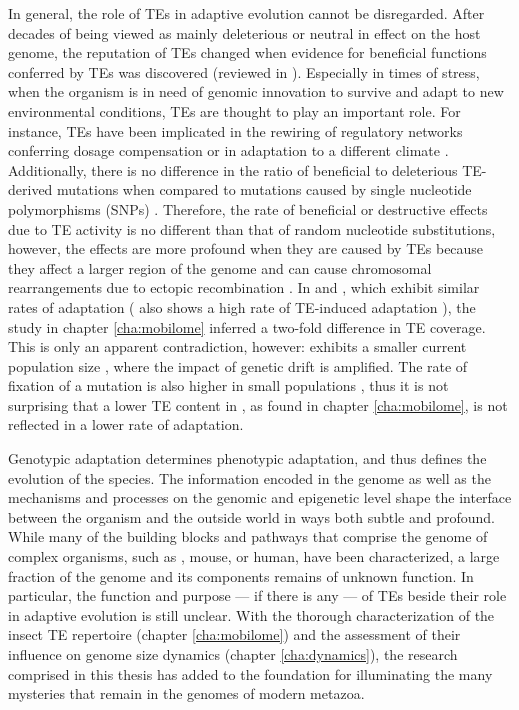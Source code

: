 In general, the role of TEs in adaptive evolution cannot be disregarded.
After decades of being viewed as mainly deleterious or neutral in effect
on the host genome, the reputation of TEs changed when evidence for
beneficial functions conferred by TEs was discovered (reviewed in
\citet{Oliver2012, Fedoroff2013}). Especially in times of stress, when
the organism is in need of genomic innovation to survive and adapt to
new environmental conditions, TEs are thought to play an important role.
For instance, TEs have been implicated in the rewiring of regulatory
networks conferring dosage compensation \citep{Ellison2013, Chuong2016}
or in adaptation to a different climate \citep{Gonzalez2010}.
Additionally, there is no difference in the ratio of beneficial to
deleterious TE-derived mutations when compared to mutations caused by
single nucleotide polymorphisms (SNPs) \citep{Akagi2013, Barron2014}.
Therefore, the rate of beneficial or destructive effects due to TE
activity is no different than that of random nucleotide substitutions,
however, the effects are more profound when they are caused by TEs
because they affect a larger region of the genome and can cause
chromosomal rearrangements due to ectopic recombination \citep{Gray2000,
Fiston-Lavier2007}. In  and , which exhibit similar rates of adaptation \citep{Bachtrog2008}
( also shows a high rate of TE-induced
adaptation \citep{Gonzalez2008}), the study in chapter
\ref{cha:mobilome} inferred a two-fold difference in TE coverage. This
is only an apparent contradiction, however: 
exhibits a smaller current population size \citep{Bachtrog2008}, where
the impact of genetic drift is amplified. The rate of fixation of a
mutation is also higher in small populations \citep{Kimura1969}, thus it
is not surprising that a lower TE content in , as
found in chapter \ref{cha:mobilome}, is not reflected in a lower rate of
adaptation.

Genotypic adaptation determines phenotypic adaptation, and thus defines
the evolution of the species.  The information encoded in the genome as
well as the mechanisms and processes on the genomic and epigenetic level
shape the interface between the organism and the outside world in ways
both subtle and profound.  While many of the building blocks and
pathways that comprise the genome of complex organisms, such as
, mouse, or human, have been characterized, a large
fraction of the genome and its components remains of unknown function.
In particular, the function and purpose --- if there is any --- of TEs
beside their role in adaptive evolution is still unclear.  With the
thorough characterization of the insect TE repertoire (chapter
\ref{cha:mobilome}) and the assessment of their influence on genome size
dynamics (chapter \ref{cha:dynamics}), the research comprised in this
thesis has added to the foundation for illuminating the many mysteries
that remain in the genomes of modern metazoa.

